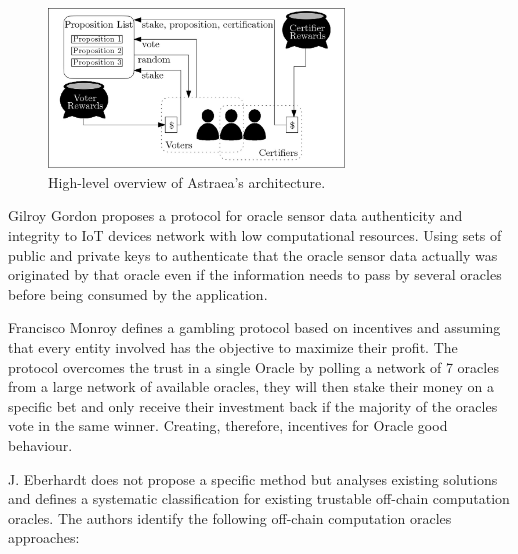 \begin{figure}[H]
  \begin{center}
    \leavevmode
    \includegraphics[width=0.7\textwidth]{figures/astraea.jpg}
    \caption{High-level overview of Astraea's architecture.}
    \label{fig:/figures/astraea}
  \end{center}
\end{figure}


Gilroy Gordon \cite{Gordon2017} proposes a protocol for oracle sensor data authenticity and integrity to IoT devices network with low computational resources. Using sets of public and private keys to authenticate that the oracle sensor data actually was originated by that oracle even if the information needs to pass by several oracles before being consumed by the application.

Francisco Monroy \cite{MontotoMonroy2018} defines a gambling protocol based on incentives and assuming that every entity involved has the objective to maximize their profit. The protocol overcomes the trust in a single Oracle by polling a network of 7 oracles from a large network of available oracles, they will then stake their money on a specific bet and only receive their investment back if the majority of the oracles vote in the same winner. Creating, therefore, incentives for Oracle good behaviour.


J. Eberhardt \cite{Eberhardt2018} does not propose a specific method but analyses existing solutions and defines a systematic classification for existing trustable off-chain computation oracles. The authors identify the following off-chain computation oracles approaches:


